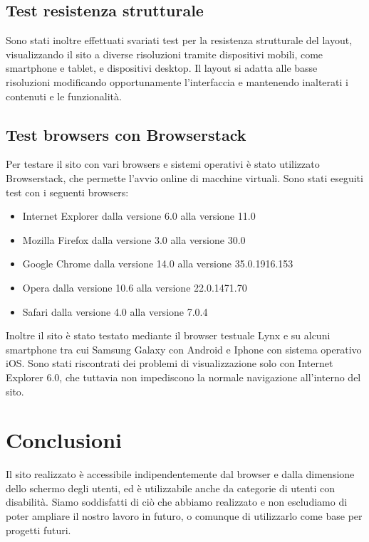 \documentclass[a4paper]{article}
\begin{document}
\newpage
\clearpage
\subsection{Test resistenza strutturale}
Sono stati inoltre effettuati svariati test per la resistenza strutturale del layout, visualizzando il sito a diverse risoluzioni tramite dispositivi mobili, come smartphone e tablet, e dispositivi desktop.
Il layout si adatta alle basse risoluzioni modificando opportunamente l'interfaccia e mantenendo inalterati i contenuti e le funzionalità.

\subsection{Test browsers con Browserstack}
Per testare il sito con vari browsers e sistemi operativi è stato utilizzato Browserstack, che permette l'avvio online di macchine virtuali.
Sono stati eseguiti test con i seguenti browsers:
\begin{itemize}
	\item Internet Explorer dalla versione 6.0 alla versione 11.0
	\item Mozilla Firefox dalla versione 3.0 alla versione 30.0
	\item Google Chrome dalla versione 14.0 alla versione 35.0.1916.153
	\item Opera dalla versione 10.6 alla versione 22.0.1471.70
	\item Safari dalla versione 4.0 alla versione 7.0.4
\end{itemize}
Inoltre il sito è stato testato mediante il browser testuale Lynx e su alcuni smartphone tra cui Samsung Galaxy con Android e Iphone con sistema operativo iOS. Sono stati riscontrati dei problemi di visualizzazione solo con Internet Explorer 6.0, che tuttavia non impediscono la normale navigazione all'interno del sito.

\section{Conclusioni}
Il sito realizzato è accessibile indipendentemente dal browser e dalla dimensione dello schermo degli utenti, ed è utilizzabile anche da categorie di utenti con disabilità. Siamo soddisfatti di ciò che abbiamo realizzato e non escludiamo di poter ampliare il nostro lavoro in futuro, o comunque di utilizzarlo come base per progetti futuri. 
\end{document}
